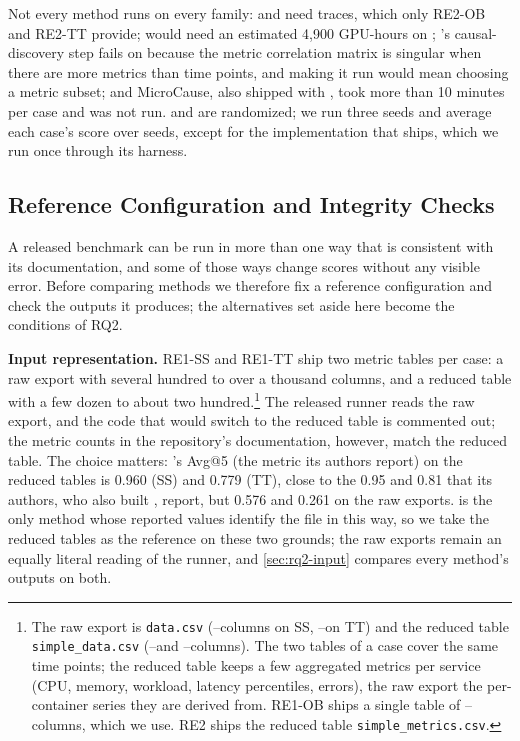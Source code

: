 Not every method runs on every family: \microrank and \tracerca need traces, which only RE2-OB and RE2-TT provide; \causalrca would need an estimated 4,900 GPU-hours on \openrca; \circa's causal-discovery step fails on \openrca because the metric correlation matrix is singular when there are more metrics than time points, and making it run would mean choosing a metric subset; and MicroCause, also shipped with \rcaeval, took more than 10 minutes per case and was not run.
\rcd and \causalrca are randomized; we run three seeds and average each case's score over seeds, except for the \rcd implementation that \petshop ships, which we run once through its harness.

\subsection{Reference Configuration and Integrity Checks}
\label{sec:design-protocol}

A released benchmark can be run in more than one way that is consistent with its documentation, and some of those ways change scores without any visible error.
Before comparing methods we therefore fix a reference configuration and check the outputs it produces; the alternatives set aside here become the conditions of RQ2.

\textbf{Input representation.}
RE1-SS and RE1-TT ship two metric tables per case: a raw export with several hundred to over a thousand columns, and a reduced table with a few dozen to about two hundred.\footnote{The raw export is \texttt{data.csv} (\ReOneSSRawColsMin--\ReOneSSRawColsMax columns on SS, \ReOneTTRawColsMin--\ReOneTTRawColsMax on TT) and the reduced table \texttt{simple\_data.csv} (\ReOneSSColsMin--\ReOneSSColsMax and \ReOneTTColsMin--\ReOneTTColsMax columns). The two tables of a case cover the same time points; the reduced table keeps a few aggregated metrics per service (CPU, memory, workload, latency percentiles, errors), the raw export the per-container series they are derived from. RE1-OB ships a single table of \ReOneOBColsMin--\ReOneOBColsMax columns, which we use. RE2 ships the reduced table \texttt{simple\_metrics.csv}.}
The released runner reads the raw export, and the code that would switch to the reduced table is commented out; the metric counts in the repository's documentation, however, match the reduced table.
The choice matters: \baro's Avg@5 (the metric its authors report) on the reduced tables is 0.960 (SS) and 0.779 (TT), close to the 0.95 and 0.81 that its authors, who also built \rcaeval, report, but 0.576 and 0.261 on the raw exports.
\baro is the only method whose reported values identify the file in this way, so we take the reduced tables as the reference on these two grounds; the raw exports remain an equally literal reading of the runner, and \cref{sec:rq2-input} compares every method's outputs on both.

